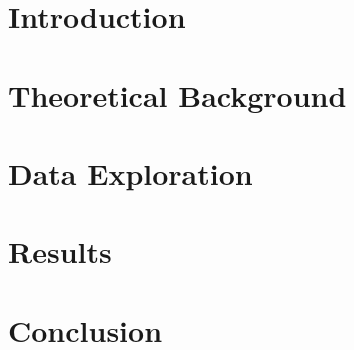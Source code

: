 \documentclass[a4paper, 12pt, oneside]{book}
\begin{document}
\chapter{Introduction}

\chapter{Theoretical Background}
 

\chapter{Data Exploration}


\chapter{Results}

\chapter{Conclusion}


\end{document}
